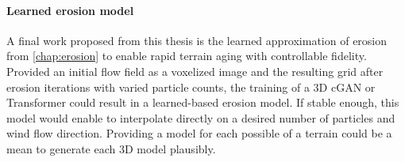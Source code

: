 
\paragraph{Learned erosion model} A final work proposed from this thesis is the learned approximation of erosion from \cref{chap:erosion} to enable rapid terrain aging with controllable fidelity. Provided an initial flow field as a voxelized image and the resulting grid after erosion iterations with varied particle counts, the training of a 3D cGAN or Transformer could result in a learned-based erosion model. If stable enough, this model would enable to interpolate directly on a desired number of particles and wind flow direction. Providing a model for each possible  of a terrain could be a mean to generate each 3D model plausibly.






